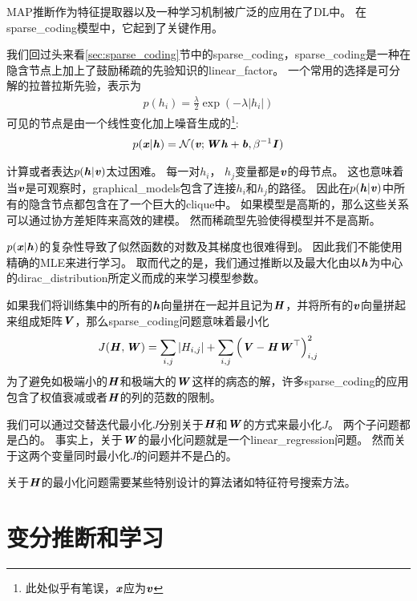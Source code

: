 \gls{MAP}推断作为特征提取器以及一种学习机制被广泛的应用在了\gls{DL}中。
在\gls{sparse_coding}模型中，它起到了关键作用。


我们回过头来看\ref{sec:sparse_coding}节中的\gls{sparse_coding}，\gls{sparse_coding}是一种在隐含节点上加上了鼓励稀疏的先验知识的\gls{linear_factor}。
一个常用的选择是可分解的拉普拉斯先验，表示为
\begin{align}
	p(h_i) = \frac{\lambda}{2} \exp(-\lambda\vert h_i\vert)
\end{align}
可见的节点是由一个线性变化加上噪音生成的\footnote{此处似乎有笔误，$\Vx$应为$\Vv$}:
\begin{align}
	p(\Vx\vert\Vh) = \CalN(\Vv;{\MW}\Vh + \Vb,\beta^{-1}{\MI})
\end{align}




计算或者表达$p(\Vh\vert\Vv)$太过困难。
每一对$h_i$， $h_j$变量都是$\Vv$的母节点。
这也意味着当$\Vv$是可观察时，\gls{graphical_models}包含了连接$h_i$和$h_j$的路径。
因此在$p(\Vh \vert\Vv)$中所有的隐含节点都包含在了一个巨大的\gls{clique}中。
如果模型是高斯的，那么这些关系可以通过协方差矩阵来高效的建模。
然而稀疏型先验使得模型并不是高斯。



$p(\Vx\vert\Vh)$的复杂性导致了似然函数的对数及其梯度也很难得到。
因此我们不能使用精确的\gls{MLE}来进行学习。
取而代之的是，我们通过推断以及最大化由以$\Vh$为中心的\gls{dirac_distribution}所定义而成的来学习模型参数。


如果我们将训练集中的所有的$\Vh$向量拼在一起并且记为$\MH$，并将所有的$\Vv$向量拼起来组成矩阵$\MV$，那么\gls{sparse_coding}问题意味着最小化
\begin{align}
	J(\MH,\MW) = \sum_{i,j}^{}\vert H_{i,j}\vert 
	+ \sum_{i,j}^{}\Big(\MV - \MH \MW^{\top}\Big)^2_{i,j}
\end{align}
为了避免如极端小的$\MH$和极端大的$\MW$这样的病态的解，许多\gls{sparse_coding}的应用包含了权值衰减或者$\MH$的列的范数的限制。


我们可以通过交替迭代最小化$J$分别关于$\MH$和$\MW$的方式来最小化$J$。
两个子问题都是凸的。
事实上，关于$\MW$的最小化问题就是一个\gls{linear_regression}问题。
然而关于这两个变量同时最小化$J$的问题并不是凸的。


关于$\MH$的最小化问题需要某些特别设计的算法诸如特征符号搜索方法\citep{HonglakLee-2007}。


\section{变分推断和学习}
\label{variational_inference_and_learning}


